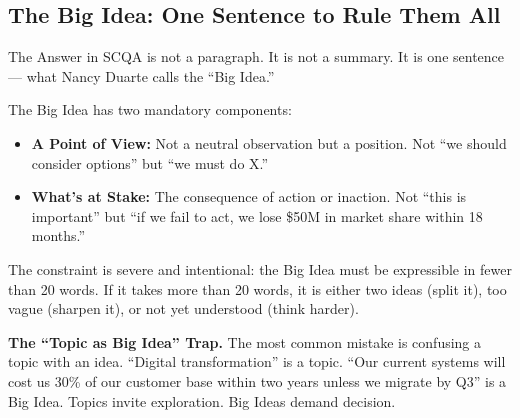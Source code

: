 \subsection{The Big Idea: One Sentence to Rule Them All}

The Answer in SCQA is not a paragraph. It is not a summary. It is one sentence --- what Nancy Duarte calls the ``Big Idea.''

The Big Idea has two mandatory components:

\begin{itemize}
  \item \textbf{A Point of View:} Not a neutral observation but a position. Not ``we should consider options'' but ``we must do X.''
  \item \textbf{What's at Stake:} The consequence of action or inaction. Not ``this is important'' but ``if we fail to act, we lose \$50M in market share within 18 months.''
\end{itemize}

The constraint is severe and intentional: the Big Idea must be expressible in fewer than 20 words. If it takes more than 20 words, it is either two ideas (split it), too vague (sharpen it), or not yet understood (think harder).

\begin{alertbox}
\textbf{The ``Topic as Big Idea'' Trap.} The most common mistake is confusing a topic with an idea. ``Digital transformation'' is a topic. ``Our current systems will cost us 30\% of our customer base within two years unless we migrate by Q3'' is a Big Idea. Topics invite exploration. Big Ideas demand decision.
\end{alertbox}

